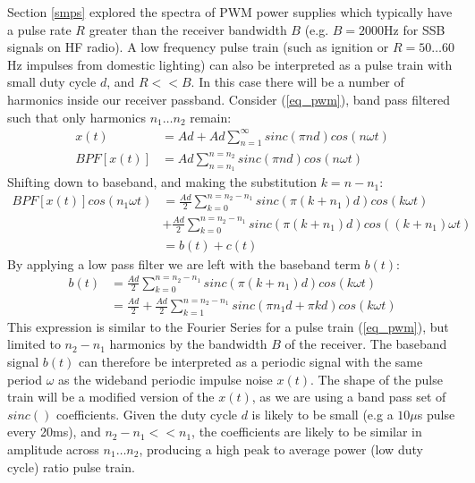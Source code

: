 \documentclass{article}
\begin{document}
Section \ref{smps} explored the spectra of PWM power supplies which typically have a pulse rate $R$ greater than the receiver bandwidth $B$ (e.g. $B=2000$Hz for SSB signals on HF radio). A low frequency pulse train (such as ignition or $R=50 \ldots 60$ Hz impulses from domestic lighting) can also be interpreted as a pulse train with small duty cycle $d$, and $R<<B$.  In this case there will be a number of harmonics inside our receiver passband.  Consider (\ref{eq_pwm}), band pass filtered such that only harmonics $n_1 \ldots n_2$ remain:
\begin{equation}
\begin{split}
x(t) &= Ad+Ad\sum_{n=1}^{\infty} sinc(\pi n d) cos(n \omega t) \\
BPF \left[ x(t) \right] &= Ad\sum_{n=n_1}^{n=n_2} sinc(\pi n d) cos(n \omega t)
\end{split}
\end{equation}
Shifting down to baseband, and making the substitution $k=n-n_1$:
\begin{equation}
\begin{split}
BPF \left[ x(t) \right] cos(n_1 \omega t) &= \frac{Ad}{2} \sum_{k=0}^{n=n_2-n_1} sinc(\pi (k+n_1) d) cos(k \omega t) \\
&+ \frac{Ad}{2} \sum_{k=0}^{n=n_2-n_1} sinc(\pi (k+n_1) d) cos((k+n_1) \omega t) \\
&= b(t) + c(t)
\end{split}
\end{equation}
By applying a low pass filter we are left with the baseband term $b(t)$:
\begin{equation}
\begin{split}
b(t) &= \frac{Ad}{2} \sum_{k=0}^{n=n_2-n_1} sinc(\pi (k+n_1) d) cos(k \omega t) \\
     &= \frac{Ad}{2} + \frac{Ad}{2} \sum_{k=1}^{n=n_2-n_1} sinc(\pi n_1 d + \pi k d) cos(k \omega t)
\end{split}
\end{equation}
This expression is similar to the Fourier Series for a pulse train (\ref{eq_pwm}), but limited to $n_2-n_1$ harmonics by the bandwidth $B$ of the receiver.  The baseband signal $b(t)$ can therefore be interpreted as a periodic signal with the same period $\omega$ as the wideband periodic impulse noise $x(t)$.  The shape of the pulse train will be a modified version of the $x(t)$, as we are using a band pass set of $sinc()$ coefficients.  Given the duty cycle $d$ is likely to be small (e.g a $10 \mu$s pulse every 20ms), and $n_2-n_1 << n_1$, the coefficients are likely to be similar in amplitude across $n_1 \ldots n_2$, producing a high peak to average power (low duty cycle) ratio pulse train.
\end{document}
